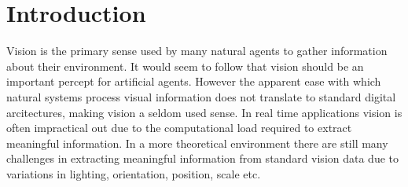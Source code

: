 \chapter{Introduction}







Vision is the primary sense used by many natural agents to gather information about their environment.
It would seem to follow that vision should be an important percept for artificial agents.
However the apparent ease with which natural systems process visual information does not translate to standard digital arcitectures, making vision a seldom used sense. 
In real time applications vision is often impractical out due to the computational load required to extract meaningful information. 
In a more theoretical environment there are still many challenges in extracting meaningful information from standard vision data due to variations in lighting, orientation, position, scale etc.


